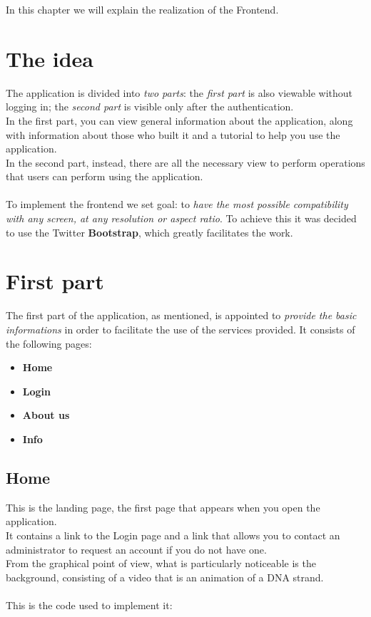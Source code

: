 In this chapter we will explain the realization of the Frontend.


\section{The idea}

The application is divided into \emph{two parts}: the \emph{first part} is also viewable without logging in; the \emph{second part} is visible only after the authentication. 
\\In the first part, you can view general information about the application, along with information about those who built it and a tutorial to help you use the application. 
\\In the second part, instead, there are all the necessary view to perform operations that users can perform using the application.
\\
\\To implement the frontend we set goal: to \emph{have the most possible compatibility with any screen, at any resolution or aspect ratio}. To achieve this it was decided to use the Twitter \textbf{Bootstrap}, which greatly facilitates the work.

\newpage


\section{First part}

The first part of the application, as mentioned, is appointed to \emph{provide the basic informations} in order to facilitate the use of the services provided. It consists of the following pages:

\begin{itemize}
	\item \textbf{Home}
	\item \textbf{Login}
	\item \textbf{About us}
	\item \textbf{Info}
\end{itemize}


\subsection{Home}

This is the landing page, the first page that appears when you open the application.
\\It contains a link to the Login page and a link that allows you to contact an administrator to request an account if you do not have one.
\\From the graphical point of view, what is particularly noticeable is the background, consisting of a video that is an animation of a DNA strand.
\\
\\This is the code used to implement it:

